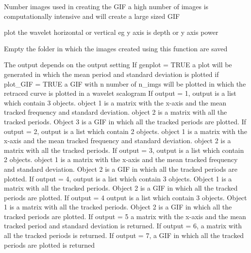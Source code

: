 \documentclass[a4paper]{book}
\begin{document}
\begin{Arguments}
\begin{ldescription}
\item[\code{n\_imgs}] Number images used in creating the GIF a high number of images
is computationally intensive and will create a large sized GIF 

\item[\code{plot\_horizontal}] plot the wavelet horizontal or vertical eg y axis
is depth or y axis power 

\item[\code{empty\_folder}] Empty the folder in which the images created using
this function are saved 
\end{ldescription}
\end{Arguments}
%
\begin{Value}
The output depends on the output setting
If genplot = TRUE a plot will be generated in which the mean period and
standard deviation is plotted
if plot\_GIF = TRUE a GIF with n number of n\_imgs will be plotted in which the
retraced curve is plotted in a wavelet scalogram
If output = 1, output is a list which contain 3 objects. object 1 is a matrix
with the x-axis and the mean tracked frequency and standard deviation.
object 2 is a matrix with all the tracked periods. Object 3 is a GIF in which
all the tracked periods are plotted.
If output = 2, output is a list which contain 2 objects. object 1 is a matrix
with the x-axis and the mean tracked frequency and standard deviation.
object 2 is a matrix with all the tracked periods.
If output = 3, output is a list which contain 2 objects. object 1 is a matrix
with the x-axis and the mean tracked frequency and standard deviation.
Object 2 is a GIF in which
all the tracked periods are plotted.
If output = 4, output is a list which contain 3 objects. Object 1 is a matrix
with all the tracked periods. Object 2 is a GIF in which  all the tracked
periods are plotted.
If output = 4 output is a list which contain 3 objects. Object 1 is a matrix
with all the tracked periods. Object 2 is a GIF in which  all the tracked
periods are plotted.
If output = 5 a matrix with the x-axis and the mean tracked period and
standard deviation is returned.
If output = 6, a matrix with all the tracked periods is returned.
If output = 7, a GIF in which all the tracked periods are plotted is returned
\end{Value}
%
\end{document}
